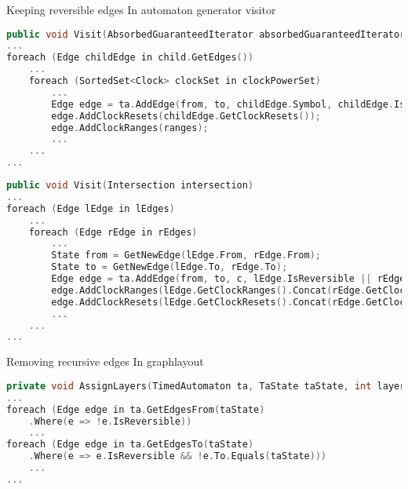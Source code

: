 \begin{frame}[fragile]{Keeping reversible edges}
    In automaton generator visitor
    \begin{lstlisting}[language=c++,basicstyle=\tiny]
public void Visit(AbsorbedGuaranteedIterator absorbedGuaranteedIterator)
...
foreach (Edge childEdge in child.GetEdges())
    ...
    foreach (SortedSet<Clock> clockSet in clockPowerSet)
        ...
        Edge edge = ta.AddEdge(from, to, childEdge.Symbol, childEdge.IsReversible);
        edge.AddClockResets(childEdge.GetClockResets());
        edge.AddClockRanges(ranges);
        ...
    ...
...
    \end{lstlisting}

    \begin{lstlisting}[language=c++,basicstyle=\tiny]
public void Visit(Intersection intersection)
...
foreach (Edge lEdge in lEdges)
    ...
    foreach (Edge rEdge in rEdges)
        ...
        State from = GetNewEdge(lEdge.From, rEdge.From);
        State to = GetNewEdge(lEdge.To, rEdge.To);
        Edge edge = ta.AddEdge(from, to, c, lEdge.IsReversible || rEdge.IsReversible);
        edge.AddClockRanges(lEdge.GetClockRanges().Concat(rEdge.GetClockRanges()));
        edge.AddClockResets(lEdge.GetClockResets().Concat(rEdge.GetClockResets()));
        ...
    ...
...
    \end{lstlisting}
\end{frame}

\begin{frame}[fragile]{Removing recursive edges}
    In graphlayout
    \begin{lstlisting}[language=c++,basicstyle=\tiny]
private void AssignLayers(TimedAutomaton ta, TaState taState, int layerIndex)
...
foreach (Edge edge in ta.GetEdgesFrom(taState)
    .Where(e => !e.IsReversible))
    ...
foreach (Edge edge in ta.GetEdgesTo(taState)
    .Where(e => e.IsReversible && !e.To.Equals(taState)))
    ...
...
    \end{lstlisting}
\end{frame}